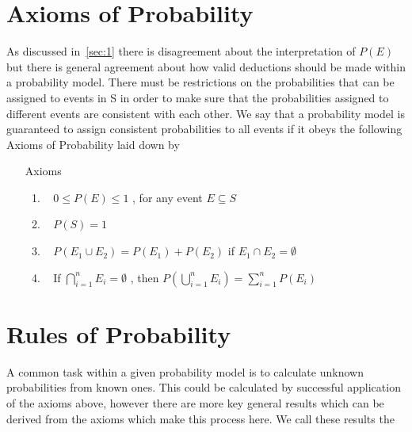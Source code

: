 \section{Axioms of Probability}
 
	 \par{As discussed in~\ref{sec:1} there is disagreement about the interpretation of $P(E)$ but there is general agreement about how valid deductions should be made within a probability model. There must be restrictions on the probabilities that can be assigned to events in S in order to make sure that the probabilities assigned to different events are consistent with each other. We say that a probability model is guaranteed to assign consistent probabilities to all events if it obeys the
	following Axioms of Probability laid down by }
	 
	 \begin{itemize}
	 \item[Axioms]
	 \begin{enumerate}
	 \item~\label{itm:ax1} $0 \leq P(E) \leq 1$ , for any event $E \subseteq S$ 
	 \item~\label{itm:ax2} $P(S) = 1$ 
	 \item~\label{itm:ax3}  $P(E_{1} \cup E_{2}) = P(E_{1}) + P(E_{2})$ if $E_{1} \cap E_{2} = \emptyset$ 
	 \item~\label{itm:ax4} If $\bigcap_{i=1}^{n}E_{i} = \emptyset$ , then $P(\bigcup_{i=1}^{n}E_{i}) = \sum_{i=1}^{n} P(E_{i})$ 
	 \end{enumerate}
	 \end{itemize}
	 

 
\section{Rules of Probability}

	\par{A common task within a given probability model is to calculate unknown probabilities from known ones. This could be calculated by successful application of the axioms above, however there are more key general results which can be derived from the axioms which make this process here. We call these results the }

	 
